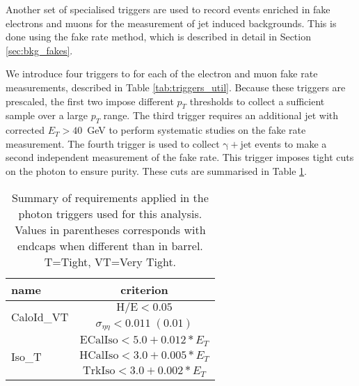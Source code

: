 Another set of specialised triggers are used to record events
enriched in fake electrons and muons for the measurement of jet induced backgrounds.
This is done using the fake rate method, which is described in detail in
Section \ref{sec:bkg_fakes}.

We introduce four triggers to for each of the electron and muon fake rate measurements,
described in Table \ref{tab:triggers_util}.
Because these triggers are prescaled, the first two impose different $p_T$ thresholds 
to collect a sufficient sample over a large $p_T$ range.
The third trigger requires an additional jet with corrected $E_{T}>40$~GeV
to perform systematic studies on the fake rate measurement.
The fourth trigger is used to collect $\mathrm{\gamma+jet}$ events to
make a second independent measurement of the fake rate.
This trigger imposes tight cuts on the photon to ensure purity.
These cuts are summarised in Table \ref{tab:PhotonPlusLeptonTriggerCuts}.

\begin{table}[htb]
 \caption{Summary of requirements applied in the photon triggers used for this analysis. 
Values in parentheses corresponds with endcaps when different than in barrel. T=Tight, VT=Very Tight.}
    \vspace{5pt}
  \label{tab:PhotonPlusLeptonTriggerCuts}
  \centering
  \begin{tabular}{l||c}
    \hline
    name                        &  criterion \\
    \hline \hline
    \multirow{2}{*}{CaloId\_VT} & $\mathrm{H/E < 0.05 }$ \\
                                & $\sigma_{\eta\eta}\mathrm{< 0.011\;(0.01)}$ \\
    \hline \hline
    \multirow{3}{*}{Iso\_T}     & $\mathrm{ECalIso} < 5.0 + 0.012*E_{T} $ \\
                                & $\mathrm{HCalIso} < 3.0 + 0.005*E_{T} $ \\
                                & $\mathrm{TrkIso}  < 3.0 + 0.002*E_{T} $ \\
    \hline
  \end{tabular}
\end{table}

